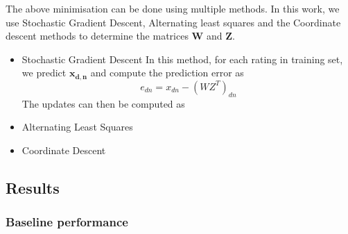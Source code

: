 \documentclass[10pt,conference,compsocconf]{IEEEtran}
\begin{document}
The above minimisation can be done using multiple methods. In this work, we use Stochastic Gradient Descent, Alternating least squares and the Coordinate descent methods to determine the matrices $\mathbf{W}$ and $\mathbf{Z}$.


\begin{itemize}

\item{Stochastic Gradient Descent}
In this method, for each rating in training set, we predict $\mathbf{x_{d,n}}$ and compute the prediction error as 
\begin{equation}
e_{dn} = x_{dn} - (WZ^{T})_{dn}
\end{equation}
The updates can then be computed as 
\begin{equation}

\end{equation}

\item{Alternating Least Squares}
\item{Coordinate Descent}


\end{itemize}

\subsection{Results}
\subsubsection{Baseline performance}
\end{document}
